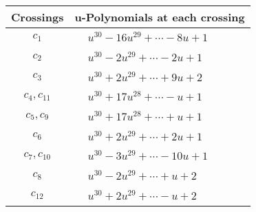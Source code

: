 \documentclass[1p]{elsarticle_modified}
\theoremstyle{definition}
\begin{document}
\begin{tabular}{m{50pt}|m{274pt}}
Crossings & \hspace{64pt}u-Polynomials at each crossing \\
\hline $$\begin{aligned}c_{1}\end{aligned}$$&$\begin{aligned}
&u^{30}-16 u^{29}+\cdots-8 u+1
\end{aligned}$\\
\hline $$\begin{aligned}c_{2}\end{aligned}$$&$\begin{aligned}
&u^{30}-2 u^{29}+\cdots-2 u+1
\end{aligned}$\\
\hline $$\begin{aligned}c_{3}\end{aligned}$$&$\begin{aligned}
&u^{30}+2 u^{29}+\cdots+9 u+2
\end{aligned}$\\
\hline $$\begin{aligned}c_{4},c_{11}\end{aligned}$$&$\begin{aligned}
&u^{30}+17 u^{28}+\cdots- u+1
\end{aligned}$\\
\hline $$\begin{aligned}c_{5},c_{9}\end{aligned}$$&$\begin{aligned}
&u^{30}+17 u^{28}+\cdots+u+1
\end{aligned}$\\
\hline $$\begin{aligned}c_{6}\end{aligned}$$&$\begin{aligned}
&u^{30}+2 u^{29}+\cdots+2 u+1
\end{aligned}$\\
\hline $$\begin{aligned}c_{7},c_{10}\end{aligned}$$&$\begin{aligned}
&u^{30}-3 u^{29}+\cdots-10 u+1
\end{aligned}$\\
\hline $$\begin{aligned}c_{8}\end{aligned}$$&$\begin{aligned}
&u^{30}-2 u^{29}+\cdots+u+2
\end{aligned}$\\
\hline $$\begin{aligned}c_{12}\end{aligned}$$&$\begin{aligned}
&u^{30}+2 u^{29}+\cdots- u+2
\end{aligned}$\\
\hline
\end{tabular}\\~\\
\end{document}
